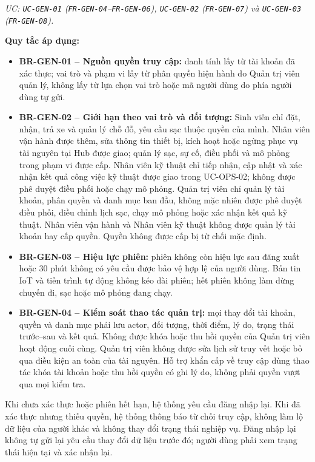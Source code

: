 \textit{UC: \texttt{UC-GEN-01} (\texttt{FR-GEN-04}--\texttt{FR-GEN-06}), \texttt{UC-GEN-02} (\texttt{FR-GEN-07}) và \texttt{UC-GEN-03} (\texttt{FR-GEN-08}).}

\medskip
\noindent\textbf{Quy tắc áp dụng:}
\begin{itemize}
  \item \textbf{BR-GEN-01 -- Nguồn quyền truy cập:} danh tính lấy từ tài khoản đã xác thực; vai trò và phạm vi lấy từ phân quyền hiện hành do Quản trị viên quản lý, không lấy từ lựa chọn vai trò hoặc mã người dùng do phía người dùng tự gửi.
  \item \textbf{BR-GEN-02 -- Giới hạn theo vai trò và đối tượng:} Sinh viên chỉ đặt, nhận, trả xe và quản lý chỗ đỗ, yêu cầu sạc thuộc quyền của mình. Nhân viên vận hành được thêm, sửa thông tin thiết bị, kích hoạt hoặc ngừng phục vụ tài nguyên tại Hub được giao; quản lý sạc, sự cố, điều phối và mô phỏng trong phạm vi được cấp. Nhân viên kỹ thuật chỉ tiếp nhận, cập nhật và xác nhận kết quả công việc kỹ thuật được giao trong UC-OPS-02; không được phê duyệt điều phối hoặc chạy mô phỏng. Quản trị viên chỉ quản lý tài khoản, phân quyền và danh mục ban đầu, không mặc nhiên được phê duyệt điều phối, điều chỉnh lịch sạc, chạy mô phỏng hoặc xác nhận kết quả kỹ thuật. Nhân viên vận hành và Nhân viên kỹ thuật không được quản lý tài khoản hay cấp quyền. Quyền không được cấp bị từ chối mặc định.
  \item \textbf{BR-GEN-03 -- Hiệu lực phiên:} phiên không còn hiệu lực sau đăng xuất hoặc 30 phút không có yêu cầu được bảo vệ hợp lệ của người dùng. Bản tin IoT và tiến trình tự động không kéo dài phiên; hết phiên không làm dừng chuyến đi, sạc hoặc mô phỏng đang chạy.
  \item \textbf{BR-GEN-04 -- Kiểm soát thao tác quản trị:} mọi thay đổi tài khoản, quyền và danh mục phải lưu actor, đối tượng, thời điểm, lý do, trạng thái trước--sau và kết quả. Không được khóa hoặc thu hồi quyền của Quản trị viên hoạt động cuối cùng. Quản trị viên không được sửa lịch sử truy vết hoặc bỏ qua điều kiện an toàn của tài nguyên. Hỗ trợ khẩn cấp về truy cập dùng thao tác khóa tài khoản hoặc thu hồi quyền có ghi lý do, không phải quyền vượt qua mọi kiểm tra.
\end{itemize}

Khi chưa xác thực hoặc phiên hết hạn, hệ thống yêu cầu đăng nhập lại. Khi đã xác thực nhưng thiếu quyền, hệ thống thông báo từ chối truy cập, không làm lộ dữ liệu của người khác và không thay đổi trạng thái nghiệp vụ. Đăng nhập lại không tự gửi lại yêu cầu thay đổi dữ liệu trước đó; người dùng phải xem trạng thái hiện tại và xác nhận lại.


